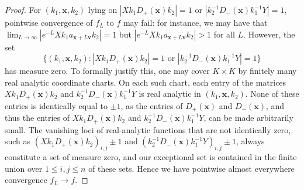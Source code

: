 \documentclass[11pt,reqno]{amsart}
\theoremstyle{definition}
\theoremstyle{remark}
\numberwithin{equation}{section}
\numberwithin{thm}{section}
\numberwithin{table}{section}
\newcommand{\x}{\mathbf{x}}
\begin{document}
\begin{proof}
    For $(k_1,\mathbf{x},k_2)$ lying on $| X k_1 D_+(\mathbf{x}) k_2|=1$ or $|  k_2^{-1} D_-(\mathbf{x}) k_1^{-1} Y |=1$, pointwise convergence 
    of $f_L$ to $f$ 
    may fail: for instance, we may have
    that $\lim_{L \to \infty} | e^{-L} X k_1 a_{\mathbf{x}+L\mathbf{v}} k_2 | =1$ but $| e^{-L} X k_1 a_{\mathbf{x}+L\mathbf{v}} k_2 | > 1 $ for all $L$.
However, the set         \[
       \{(k_1,\x,k_2) :
        | X k_1 D_+(\mathbf{x}) k_2| = 1
        \text{ or }
        |  k_2^{-1} D_-(\mathbf{x}) k_1^{-1} Y | =1
        \}
        \]
        has measure zero.
       To formally justify this, one may cover $K \times K$ by finitely many real 
       analytic coordinate charts. On
each such chart, each entry of the matrices
$Xk_1D_+(\mathbf{x})k_2$ and $k_2^{-1}D_-(\mathbf{x})k_1^{-1}Y$ is real
analytic in $(k_1,\mathbf x,k_2)$. None of these entries is identically equal
to $\pm 1$, as the entries of $D_+(\mathbf x)$ and
$D_-(\mathbf x)$, and thus the entries of $Xk_1D_+(\mathbf{x})k_2$ and $k_2^{-1}D_-(\mathbf{x})k_1^{-1}Y$, can be made arbitrarily small. The vanishing loci of real-analytic functions that are not identically zero, such as $(X k_1 D_+(\mathbf{x}) k_2)_{i,j}\pm1$ and $(k_2^{-1} D_-(\mathbf{x}) k_1^{-1} Y)_{i,j}\pm1$, always constitute a set of measure zero, and our exceptional set is contained in the finite union over $1 \le i,j \le n$ of these sets.
Hence we have pointwise almost everywhere convergence 
$f_L \to f$.


\end{proof}
\end{document}
